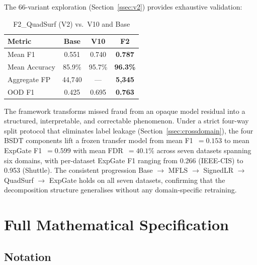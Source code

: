\documentclass[journal]{IEEEtran}
\begin{document}
The 66-variant exploration (Section~\ref{ssec:v2}) provides exhaustive validation:

\begin{table}[!t]
\centering
\caption{F2\_QuadSurf (V2) vs.\ V10 and Base}
\label{tab:v2_summary}
\begin{tabular}{@{}lccc@{}}
\toprule
\textbf{Metric} & \textbf{Base} & \textbf{V10} & \textbf{F2} \\
\midrule
Mean F1       & 0.551  & 0.740  & \textbf{0.787} \\
Mean Accuracy & 85.9\% & 95.7\% & \textbf{96.3\%} \\
Aggregate FP  & 44{,}740 & ---  & \textbf{5{,}345} \\
OOD F1        & 0.425  & 0.695  & \textbf{0.763} \\
\bottomrule
\end{tabular}
\end{table}

The framework transforms missed fraud from an opaque model residual into a structured, interpretable, and correctable phenomenon. Under a strict four-way split protocol that eliminates label leakage (Section~\ref{ssec:crossdomain}), the four BSDT components lift a frozen transfer model from mean F1~$= 0.153$ to mean ExpGate F1~$= 0.599$ with mean FDR~$= 40.1\%$ across seven datasets spanning six domains, with per-dataset ExpGate F1 ranging from 0.266 (IEEE-CIS) to 0.953 (Shuttle). The consistent progression Base $\to$ MFLS $\to$ SignedLR $\to$ QuadSurf $\to$ ExpGate holds on all seven datasets, confirming that the decomposition structure generalises without any domain-specific retraining.




\appendices

\section{Full Mathematical Specification}
\label{app:math}

\subsection{Notation}
\end{document}
